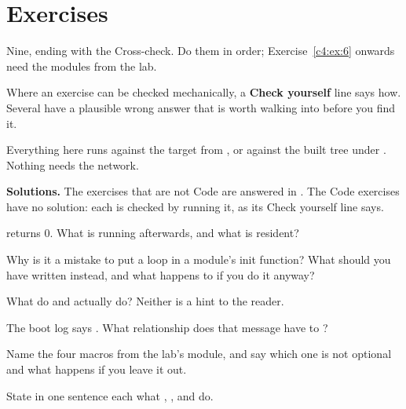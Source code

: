 
\section{Exercises}
\label{c4:sec:exercises}\label{c4:app:b}

\begin{aside}
Nine, ending with the Cross-check. Do them in order; Exercise~\ref{c4:ex:6} onwards need the modules
from the lab.

Where an exercise can be checked mechanically, a \textbf{Check yourself} line says how. Several have
a plausible wrong answer that is worth walking into before you find it.

Everything here runs against the target from , or against the built tree under
. Nothing needs the network.

\textbf{Solutions.} The exercises that are not Code are answered in . The Code
exercises have no solution: each is checked by running it, as its Check yourself line says.
\end{aside}

\label{c4:ex:1}

  returns 0. What is running afterwards, and what is resident?

 Why is it a mistake to put a  loop in a module's init function? What
should you have written instead, and what happens to  if you do it anyway?

 What do  and  actually do? Neither is a hint to the reader.

 The boot log says . What relationship does that
message have to ?

 Name the four  macros from the lab's module, and say which one is not
optional and what happens if you leave it out.

\label{c4:ex:2}

 State in one sentence each what , ,  and
 do.

